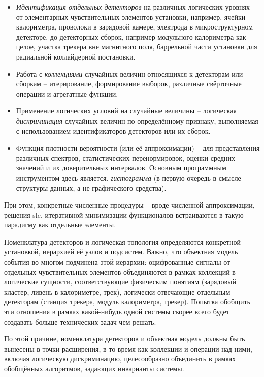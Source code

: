\begin{itemize}
    \item  \emph{Идентификация отдельных детекторов} на различных
    логических уровнях -- от элементарных чувствительных элементов
    установки, например, ячейки калориметра, проволоки в зарядовой камере,
    электрода в микроструктурном детекторе, до детекторных сборок, например
    модульного калориметра как целое, участка трекера вне магнитного
    поля, баррельной части установки для радиальной коллайдерной
    постановки.
    \item Работа с \emph{коллекциями} случайных величин относящихся к
    детекторам или сборкам -- итерирование, формирование выборок,
    различные свёрточные операции и агрегатные функции.
    \item Применение логических условий на случайные величины --
    логическая \emph{дискриминация} случайных величин по определённому
    признаку, выполняемая с использованием идентификаторов детекторов
    или их сборок.
    \item Функция плотности вероятности (или её аппроксимации) --
    для представления различных спектров, статистических
    перенормировок, оценки средних значений и их доверительных
    интервалов. Основным программным инструментом здесь является.
    \emph{гистограмма} (в первую очередь в смысле структуры данных,
    а не графического средства).
\end{itemize}

При этом, конкретные численные процедуры -- вроде численной аппроксимации,
решения \acrshort{sle}, итеративной минимизации функционалов встраиваются в такую
парадигму как отдельные элементы.

Номенклатура детекторов и логическая топология определяются
конкретной установкой, иерархией её узлов и подсистем. Важно, что
объектная модель события во многом подчинена этой иерархии:
оцифрованные сигналы от отдельных чувствительных элементов
объединяются в рамках коллекций в логические сущности, соответствующие
физическим понятиям (зарядовый кластер, ливень в калориметре,
трек), логически отвечающие отдельным детекторам (станция трекера,
модуль калориметра, трекер). Попытка обобщить эти отношения в рамках
какой-нибудь одной системы скорее всего будет создавать больше
технических задач чем решать.

По этой причине, номенклатура детекторов и объектная модель должны
быть вынесены в точки расширения, в то время как коллекции и операции над
ними, включая логическую дискриминацию, целесообразно объединить в
рамках обобщённых алгоритмов, задающих инварианты системы.
